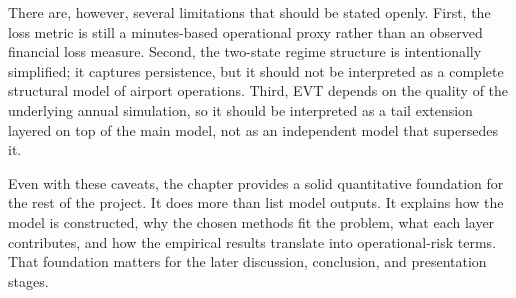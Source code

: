 \documentclass[11pt]{article}
\begin{document}
There are, however, several limitations that should be stated openly. First, the loss metric is still a minutes-based operational proxy rather than an observed financial loss measure. Second, the two-state regime structure is intentionally simplified; it captures persistence, but it should not be interpreted as a complete structural model of airport operations. Third, EVT depends on the quality of the underlying annual simulation, so it should be interpreted as a tail extension layered on top of the main model, not as an independent model that supersedes it.

Even with these caveats, the chapter provides a solid quantitative foundation for the rest of the project. It does more than list model outputs. It explains how the model is constructed, why the chosen methods fit the problem, what each layer contributes, and how the empirical results translate into operational-risk terms. That foundation matters for the later discussion, conclusion, and presentation stages.
\end{document}

